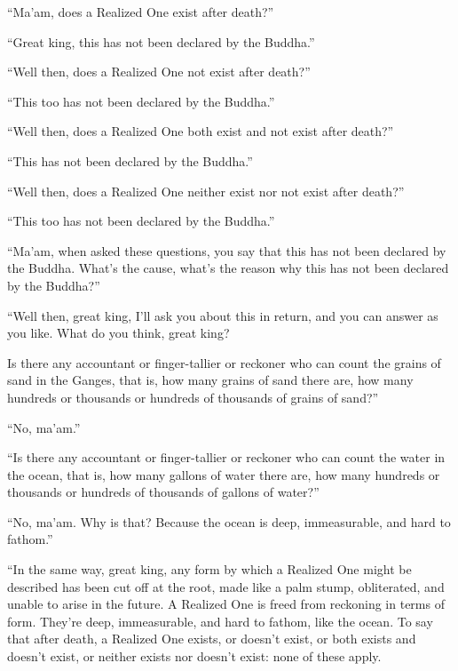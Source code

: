 \documentclass[12pt,openany]{book}%
\begin{document}
“Ma’am, does a Realized One exist after death?” 

“Great king, this has not been declared by the Buddha.” 

“Well then, does a Realized One not exist after death?” 

“This too has not been declared by the Buddha.” 

“Well then, does a Realized One both exist and not exist after death?” 

“This has not been declared by the Buddha.” 

“Well then, does a Realized One neither exist nor not exist after death?” 

“This too has not been declared by the Buddha.” 

“Ma’am, when asked these questions, you say that this has not been declared by the Buddha. What’s the cause, what’s the reason why this has not been declared by the Buddha?” 

“Well then, great king, I’ll ask you about this in return, and you can answer as you like. What do you think, great king? 

Is there any accountant or finger-tallier or reckoner who can count the grains of sand in the Ganges, that is, how many grains of sand there are, how many hundreds or thousands or hundreds of thousands of grains of sand?” 

“No, ma’am.” 

“Is there any accountant or finger-tallier or reckoner who can count the water in the ocean, that is, how many gallons of water there are, how many hundreds or thousands or hundreds of thousands of gallons of water?” 

“No, ma’am. Why is that? Because the ocean is deep, immeasurable, and hard to fathom.” 

“In the same way, great king, any form by which a Realized One might be described has been cut off at the root, made like a palm stump, obliterated, and unable to arise in the future. A Realized One is freed from reckoning in terms of form. They’re deep, immeasurable, and hard to fathom, like the ocean. To say that after death, a Realized One exists, or doesn’t exist, or both exists and doesn’t exist, or neither exists nor doesn’t exist: none of these apply. 
\end{document}
